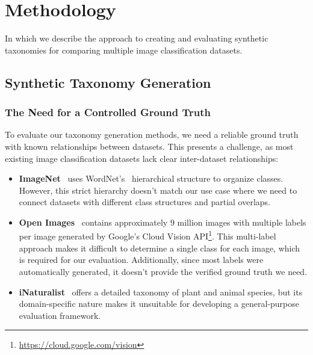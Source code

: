 \chapter{Methodology}

\begin{center}
    \begin{minipage}{0.5\textwidth}
        \begin{small}
            In which we describe the approach to creating and evaluating synthetic taxonomies
            for comparing multiple image classification datasets.
        \end{small}
    \end{minipage}
    \vspace{0.5cm}
\end{center}

\section{Synthetic Taxonomy Generation}

\subsection{The Need for a Controlled Ground Truth}

To evaluate our taxonomy generation methods, we need a reliable ground truth with known relationships between datasets. This presents a challenge, as most existing image classification datasets lack clear inter-dataset relationships:

\begin{itemize}
    \item \textbf{ImageNet}~\cite{deng_imagenet_2009,russakovsky_imagenet_2015}
          uses WordNet's~\cite{fellbaum_wordnet_1998} hierarchical structure to organize classes.
          However, this strict hierarchy doesn't match our use case where we need to connect
          datasets with different class structures and partial overlaps.

    \item \textbf{Open Images}~\cite{kuznetsova_open_2020} contains approximately 9 million
          images with multiple labels per image generated by Google's Cloud Vision API\footnote{\url{https://cloud.google.com/vision}}.
          This multi-label approach makes it difficult to determine a single class for each image,
          which is required for our evaluation. Additionally, since most labels were automatically
          generated, it doesn't provide the verified ground truth we need.

    \item \textbf{iNaturalist}~\cite{horn_inaturalist_2018} offers a detailed taxonomy of
          plant and animal species, but its domain-specific nature makes it unsuitable
          for developing a general-purpose evaluation framework.
\end{itemize}


